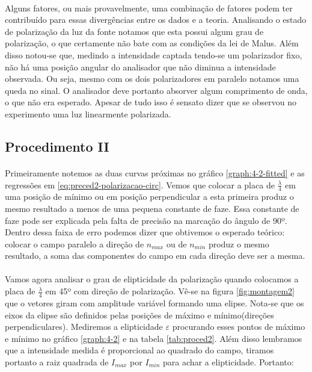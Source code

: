 \documentclass[a4paper,11pt]{article}
\begin{document}
\paragraph{}Alguns fatores, ou mais provavelmente, uma combinação de fatores podem ter contribuído para essas divergências entre os dados e a teoria. Analisando o estado de polarização da luz da fonte notamos que esta possui algum grau de polarização, o que certamente não bate com as condições da lei de Malus. Além disso notou-se que, medindo a intensidade captada tendo-se um polarizador fixo, não há uma posição angular do analisador que não diminua a intensidade observada. Ou seja, mesmo com os dois polarizadores em paralelo notamos uma queda no sinal. O analisador deve portanto absorver algum comprimento de onda, o que não era esperado. Apesar de tudo isso é sensato dizer que se observou no experimento uma luz linearmente polarizada.

\subsection*{Procedimento II}
\paragraph{} Primeiramente notemos as duas curvas próximas no gráfico \ref{graph:4-2-fitted} e as regressões em \ref{eq:preced2-polarizacao-circ}. Vemos que colocar a placa de $\frac{\lambda}{4}$ em uma posição de mínimo ou em posição perpendicular a esta primeira produz o mesmo resultado a menos de uma pequena constante de faze. Essa constante de faze pode ser explicada pela falta de precisão na marcação do ângulo de 90º. Dentro dessa faixa de erro podemos dizer que obtivemos o esperado teórico: colocar o campo paralelo a direção de $n_{max}$ ou de $n_{min}$ produz o mesmo resultado, a soma das componentes do campo em cada direção deve ser a mesma. 
\paragraph{}Vamos agora analisar o grau de elipticidade da polarização quando colocamos a placa de $\frac{\lambda}{4}$ em 45º com direção de polarização. Vê-se na figura \ref{fig:montagem2} que o vetores giram com amplitude variável formando uma elipse. Nota-se que os eixos da elipse são definidos pelas posições de máximo e mínimo(direções perpendiculares). Mediremos a elipticidade $\varepsilon$ procurando esses pontos de máximo e mínimo no gráfico \ref{graph:4-2} e na tabela \ref{tab:proced2}. Além disso lembramos que a intensidade medida é proporcional ao quadrado do campo, tiramos portanto a raiz quadrada de $I_{max}$ por $I_{min}$ para achar a elipticidade. Portanto:
\end{document}

